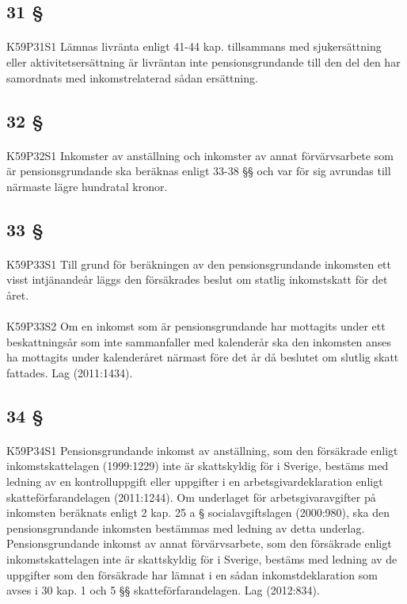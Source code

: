 \documentclass[a4paper,notitlepage,openany,10pt]{book}
\begin{document}
\subsection*{31 §}
\paragraph*{}
{\tiny K59P31S1}
Lämnas livränta enligt 41-44 kap. tillsammans med sjukersättning eller aktivitetsersättning är livräntan inte pensionsgrundande till den del den har samordnats med inkomstrelaterad sådan ersättning.
\subsection*{32 §}
\paragraph*{}
{\tiny K59P32S1}
Inkomster av anställning och inkomster av annat förvärvsarbete som är pensionsgrundande ska beräknas enligt 33-38 §§ och var för sig avrundas till närmaste lägre hundratal kronor.
\subsection*{33 §}
\paragraph*{}
{\tiny K59P33S1}
Till grund för beräkningen av den pensionsgrundande inkomsten ett visst intjänandeår läggs den försäkrades beslut om statlig inkomstskatt för det året.
\paragraph*{}
{\tiny K59P33S2}
Om en inkomst som är pensionsgrundande har mottagits under ett beskattningsår som inte sammanfaller med kalenderår ska den inkomsten anses ha mottagits under kalenderåret närmast före det år då beslutet om slutlig skatt fattades.
Lag (2011:1434).
\subsection*{34 §}
\paragraph*{}
{\tiny K59P34S1}
Pensionsgrundande inkomst av anställning, som den försäkrade enligt inkomstskattelagen (1999:1229) inte är skattskyldig för i Sverige, bestäms med ledning av en kontrolluppgift eller uppgifter i en arbetsgivardeklaration enligt skatteförfarandelagen (2011:1244). Om underlaget för arbetsgivaravgifter på inkomsten beräknats enligt 2 kap. 25 a § socialavgiftslagen (2000:980), ska den pensionsgrundande inkomsten bestämmas med ledning av detta underlag.
Pensionsgrundande inkomst av annat förvärvsarbete, som den försäkrade enligt inkomstskattelagen inte är skattskyldig för i Sverige, bestäms med ledning av de uppgifter som den försäkrade har lämnat i en sådan inkomstdeklaration som avses i 30 kap. 1 och 5 §§ skatteförfarandelagen.
Lag (2012:834).
\end{document}
